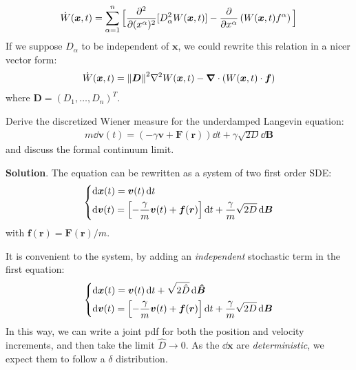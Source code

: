 \documentclass[../template.tex]{subfiles}
\begin{document}
\begin{exo}
\begin{align*}
    \dot{W}(\bm{x},t) = \sum_{\alpha=1}^n \Big[\pdv[2]{(x^\alpha)}[D_\alpha^2 W(\bm{x},t)] -  \pdv{x^\alpha}\left(W(\bm{x},t) f^\alpha\right)\Big]
\end{align*}
If we suppose $D_\alpha$ to be independent of $\bm{x}$, we could rewrite this relation in a nicer vector form:
\begin{align*}
    \dot{W}(\bm{x},t) = \norm{\bm{D}}^2 \nabla^2 W(\bm{x},t) - \bm{\nabla} \cdot (W(\bm{x},t) \cdot \bm{f})
\end{align*}
where $\bm{D} = (D_1, \dots, D_n)^T$.
    
\end{exo}

\begin{exo}
    Derive the discretized Wiener measure for the underdamped Langevin equation:
    \begin{align*}
        m \dd{\bm{v}(t)} = (-\gamma \bm{v} + \bm{F}(\bm{r}))\dd{t} + \gamma \sqrt{2 D} \dd{\bm{B}}
    \end{align*}
    and discuss the formal continuum limit.

    \medskip

    \textbf{Solution}. The equation can be rewritten as a system of two first order SDE:
    \begin{align*}
        \begin{dcases}
            \dd{\bm{x}(t)} = \bm{v}(t) \dd{t}\\
            \dd{\bm{v}(t)} = \left[-\frac{\gamma}{m} \bm{v}(t) + \bm{f}(\bm{r})\right] \dd{t} + \frac{\gamma}{m} \sqrt{2D} \dd{\bm{B}} 
        \end{dcases}
    \end{align*}
    with $\bm{f}(\bm{r}) = \bm{F}(\bm{r})/m$.

    It is convenient to  the system, by adding an \textit{independent} stochastic term in the first equation:
    \begin{align*}
        \begin{dcases}
            \dd{\bm{x}(t)} = \bm{v}(t) \dd{t}+ \sqrt{2\hat{D}} \dd{\bm{\hat{B}}}\\
            \dd{\bm{v}(t)} = \left[-\frac{\gamma}{m} \bm{v}(t) + \bm{f}(\bm{r})\right] \dd{t} +\frac{\gamma}{m} \sqrt{2D} \dd{\bm{B}} 
        \end{dcases}
    \end{align*} 
    In this way, we can write a joint pdf for both the position and velocity increments, and then take the limit $\hat{D} \to 0$. As the $\dd{\bm{x}}$ are \textit{deterministic}, we expect them to follow a $\delta$ distribution.
    

\end{exo}
\end{document}
